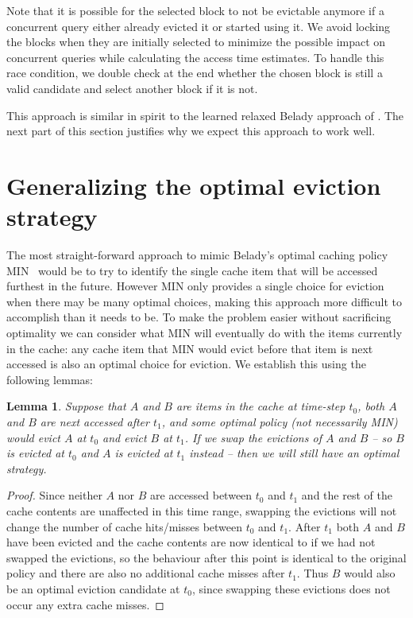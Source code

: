 Note that it is possible for the selected block to not be evictable anymore if a concurrent query either already evicted it or started using it. We avoid locking the blocks when they are initially selected to minimize the possible impact on concurrent queries while calculating the access time estimates. To handle this race condition, we double check at the end whether the chosen block is still a valid candidate and select another block if it is not.

This approach is similar in spirit to the learned relaxed Belady approach of \citet{relaxedBelady}. The next part of this section justifies why we expect this approach to work well.


\section{Generalizing the optimal eviction strategy\label{sec:generalized-MIN}}
The most straight-forward approach to mimic Belady's optimal caching policy MIN~\cite{beladyMIN} would be to try to identify the single cache item that will be accessed furthest in the future. However MIN only provides a single choice for eviction when there may be many optimal choices, making this approach more difficult to accomplish than it needs to be. To make the problem easier without sacrificing optimality we can consider what MIN will eventually do with the items currently in the cache: any cache item that MIN would evict before that item is next accessed is also an optimal choice for eviction. We establish this using the following lemmas:

\newtheorem{claim}{Lemma}

\begin{claim}\label{lemma:swap-opt}
Suppose that $A$ and $B$ are items in the cache at time-step $t_0$, both $A$ and $B$ are next accessed after $t_1$, and some optimal policy (not necessarily MIN) would evict $A$ at $t_0$ and evict $B$ at $t_1$. If we swap the evictions of $A$ and $B$ -- so $B$ is evicted at $t_0$ and $A$ is evicted at $t_1$ instead -- then we will still have an optimal strategy.
\end{claim}

\begin{proof}
Since neither $A$ nor $B$ are accessed between $t_0$ and $t_1$ and the rest of the cache contents are unaffected in this time range, swapping the evictions will not change the number of cache hits/misses between $t_0$ and $t_1$. After $t_1$ both $A$ and $B$ have been evicted and the cache contents are now identical to if we had not swapped the evictions, so the behaviour after this point is identical to the original policy and there are also no additional cache misses after $t_1$. Thus $B$ would also be an optimal eviction candidate at $t_0$, since swapping these evictions does not occur any extra cache misses.
\end{proof}

